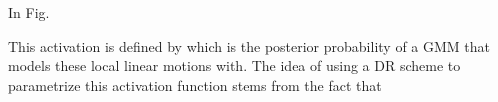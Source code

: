 \documentclass{article}
\begin{document}
In Fig.




This activation is defined by  which is the posterior probability of a GMM that models these local linear motions with. The idea of using a DR scheme to parametrize this activation function stems from the fact that



\end{document}
